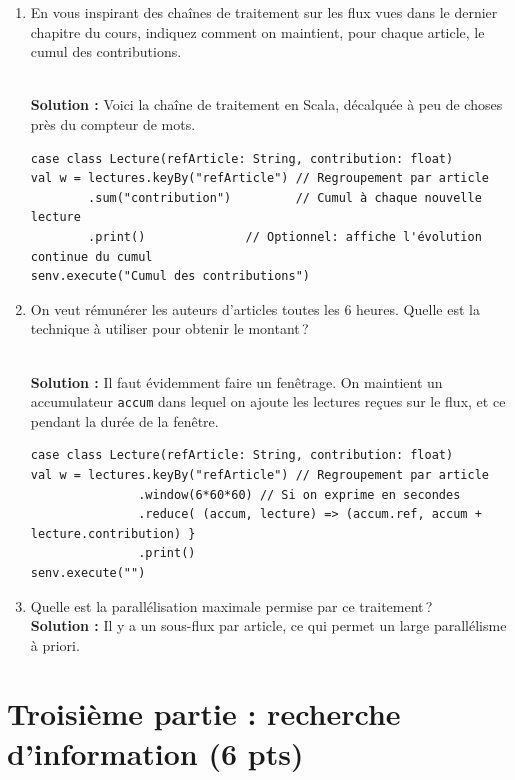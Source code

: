 \documentclass[11pt,a4paper]{article}
\newenvironment{solution}[0]{
~\\ \color{red} \textbf{Solution : }\color{black}}{%
}
\begin{document}
\begin{enumerate}
\item En vous inspirant des chaînes de traitement sur les flux vues dans le dernier chapitre
du cours, indiquez comment on maintient, pour chaque article, le cumul des contributions.

\begin{solution}
Voici la chaîne de traitement en Scala, décalquée à peu de choses près du compteur de mots.
\begin{small}
\begin{verbatim}
case class Lecture(refArticle: String, contribution: float)
val w = lectures.keyBy("refArticle") // Regroupement par article
        .sum("contribution")         // Cumul à chaque nouvelle lecture
        .print()              // Optionnel: affiche l'évolution continue du cumul
senv.execute("Cumul des contributions")
\end{verbatim}
\end{small}
\end{solution}

\item On veut rémunérer les auteurs d'articles toutes les 6 heures. Quelle est 
   la technique à utiliser pour obtenir le montant\,?
   
\begin{solution}
Il faut évidemment faire un fenêtrage. On maintient un accumulateur \texttt{accum}
dans lequel on ajoute les lectures reçues sur le flux, et ce pendant la durée de la fenêtre.
\begin{small}
\begin{verbatim}
case class Lecture(refArticle: String, contribution: float)
val w = lectures.keyBy("refArticle") // Regroupement par article
               .window(6*60*60) // Si on exprime en secondes
               .reduce( (accum, lecture) => (accum.ref, accum + lecture.contribution) }
               .print()
senv.execute("")
\end{verbatim}
\end{small}
\end{solution}

  \item Quelle est la parallélisation maximale permise par ce traitement\,?
\begin{solution}
Il y a un sous-flux par article, ce qui permet un large parallélisme à priori.
\end{solution}
\end{enumerate}


\section*{Troisième partie : recherche d'information (6 pts)}
\end{document}
